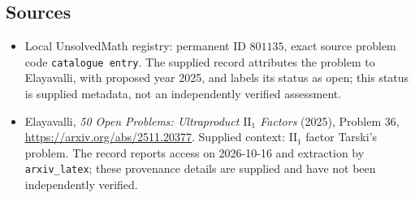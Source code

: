 \documentclass[11pt]{article}
\begin{document}
\subsection{Sources}
\begin{itemize}
\item Local UnsolvedMath registry: permanent ID \(801135\), exact source problem code \texttt{catalogue entry}. The supplied record attributes the problem to Elayavalli, with proposed year 2025, and labels its status as open; this status is supplied metadata, not an independently verified assessment.
\item Elayavalli, \emph{50 Open Problems: Ultraproduct \(\mathrm{II}_1\) Factors} (2025), Problem 36, \url{https://arxiv.org/abs/2511.20377}. Supplied context: \(\mathrm{II}_1\) factor Tarski's problem. The record reports access on 2026-10-16 and extraction by \texttt{arxiv\_latex}; these provenance details are supplied and have not been independently verified.
\end{itemize}
\end{document}
